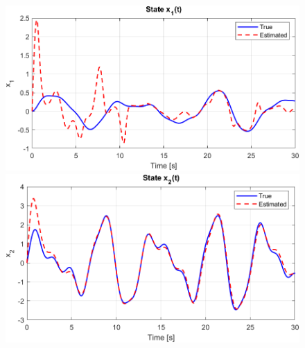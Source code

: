 \documentclass[12pt]{article} %
\numberwithin{equation}{section}  %
\begin{document}
\begin{figure}[ht!]
    \centering
    \begin{minipage}{0.48\textwidth}
        \centering
        \includegraphics[width=0.8\linewidth]{plots/plot7_1_x1_o2.png}
    \end{minipage}
    \hfill
    \begin{minipage}{0.48\textwidth}
        \centering
        \includegraphics[width=0.8\linewidth]{plots/plot7_2_x2_o2.png}
    \end{minipage}
    
    \vspace{1em} %
    

\end{figure}
\end{document}
